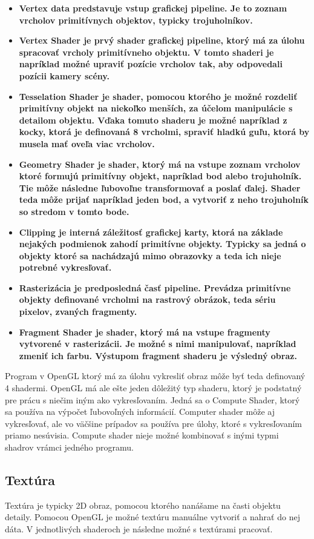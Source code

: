 \begin{itemize}
    \item{\bf Vertex data \rm predstavuje vstup grafickej pipeline. Je to zoznam vrcholov primitívnych objektov, typicky trojuholníkov.}
    \item{\bf Vertex Shader \rm je prvý shader grafickej pipeline, ktorý má za úlohu spracovať vrcholy primitívneho objektu. V tomto shaderi je napríklad možné upraviť pozície vrcholov tak, aby odpovedali pozícii kamery scény.}
    \item{\bf Tesselation Shader \rm je shader, pomocou ktorého je možné rozdeliť primitívny objekt na niekoľko menších, za účelom manipulácie s detailom objektu. Vďaka tomuto shaderu je možné napríklad z kocky, ktorá je definovaná 8 vrcholmi, spraviť hladkú guľu, ktorá by musela mať oveľa viac vrcholov.}
    \item{\bf Geometry Shader \rm je shader, ktorý má na vstupe zoznam vrcholov ktoré formujú primitívny objekt, napríklad bod alebo trojuholník. Tie môže následne ľubovoľne transformovať a poslať ďalej. Shader teda môže prijať napríklad jeden bod, a vytvoriť z neho trojuholník so stredom v tomto bode.}
    \item{\bf Clipping \rm je interná záležitosť grafickej karty, ktorá na základe nejakých podmienok zahodí primitívne objekty. Typicky sa jedná o objekty ktoré sa nachádzajú mimo obrazovky a teda ich nieje potrebné vykresľovať.}
    \item{\bf Rasterizácia \rm je predposledná časť pipeline. Prevádza primitívne objekty definované vrcholmi na rastrový obrázok, teda sériu pixelov, zvaných fragmenty.}
    \item{\bf Fragment Shader \rm je shader, ktorý má na vstupe fragmenty vytvorené v rasterizácii. Je možné s nimi manipulovať, napríklad zmeniť ich farbu. Výstupom fragment shaderu je výsledný obraz.}
\end{itemize}

Program v OpenGL ktorý má za úlohu vykresliť obraz môže byť teda definovaný 4 shadermi. OpenGL má ale ešte jeden dôležitý typ shaderu, ktorý je podstatný pre prácu s niečim iným ako vykresľovaním. Jedná sa o Compute Shader, ktorý sa používa na výpočet ľubovoľných informácií. Computer shader môže aj vykresľovať, ale vo väčšine prípadov sa používa pre úlohy, ktoré s vykresľovaním priamo nesúvisia. Compute shader nieje možné kombinovať s inými typmi shadrov vrámci jedného programu.

\subsection*{Textúra}
Textúra je typicky 2D obraz, pomocou ktorého nanášame na časti objektu detaily. Pomocou OpenGL je možné textúru manuálne vytvoriť a nahrať do nej dáta. V jednotlivých shaderoch je následne možné s textúrami pracovať.


